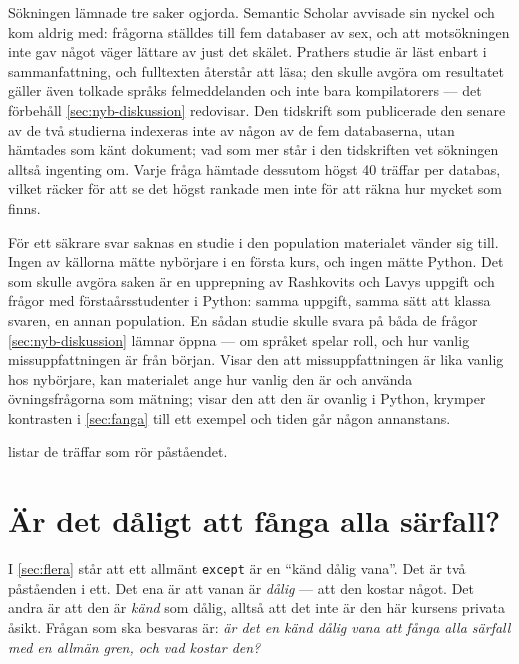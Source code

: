 Sökningen lämnade tre saker ogjorda.  Semantic Scholar avvisade sin
nyckel och kom aldrig med: frågorna ställdes till fem databaser av sex,
och att motsökningen inte gav något väger lättare av just det skälet.
Prathers studie är läst enbart i
sammanfattning\autocite{Prather2017CEM}, och fulltexten återstår att
läsa; den skulle avgöra om resultatet gäller även tolkade språks
felmeddelanden och inte bara kompilatorers --- det förbehåll
\cref{sec:nyb-diskussion} redovisar.  Den tidskrift som publicerade den
senare av de två studierna indexeras inte av någon av de fem
databaserna, utan hämtades som känt dokument; vad som mer står i den
tidskriften vet sökningen alltså ingenting om.  Varje fråga hämtade
dessutom högst 40 träffar per databas, vilket räcker för att se det
högst rankade men inte för att räkna hur mycket som finns.

För ett säkrare svar saknas en studie i den population materialet
vänder sig till.  Ingen av källorna mätte nybörjare i en första kurs,
och ingen mätte Python.  Det som skulle avgöra saken är en upprepning
av Rashkovits och Lavys uppgift och frågor med förstaårsstudenter i
Python: samma uppgift, samma sätt att klassa svaren, en annan
population.  En sådan studie skulle svara på båda de frågor
\cref{sec:nyb-diskussion} lämnar öppna --- om språket spelar roll, och
hur vanlig missuppfattningen är från början.  Visar den att
missuppfattningen är lika vanlig hos nybörjare, kan materialet ange hur
vanlig den är och använda övningsfrågorna som mätning; visar den att
den är ovanlig i Python, krymper kontrasten i \cref{sec:fanga} till ett
exempel och tiden går någon annanstans.

\bigskip
\noindent
{} listar de träffar som rör påståendet.



\chapter{Är det dåligt att fånga alla särfall?}
\label{app:catchall}

I \cref{sec:flera} står att ett allmänt \texttt{except} är en
\enquote{känd dålig vana}.  Det är två påståenden i ett.  Det ena är att
vanan är \emph{dålig} --- att den kostar något.  Det andra är att den är
\emph{känd} som dålig, alltså att det inte är den här kursens privata
åsikt.  Frågan som ska besvaras är: \emph{är det en känd dålig vana att
fånga alla särfall med en allmän gren, och vad kostar den?}

